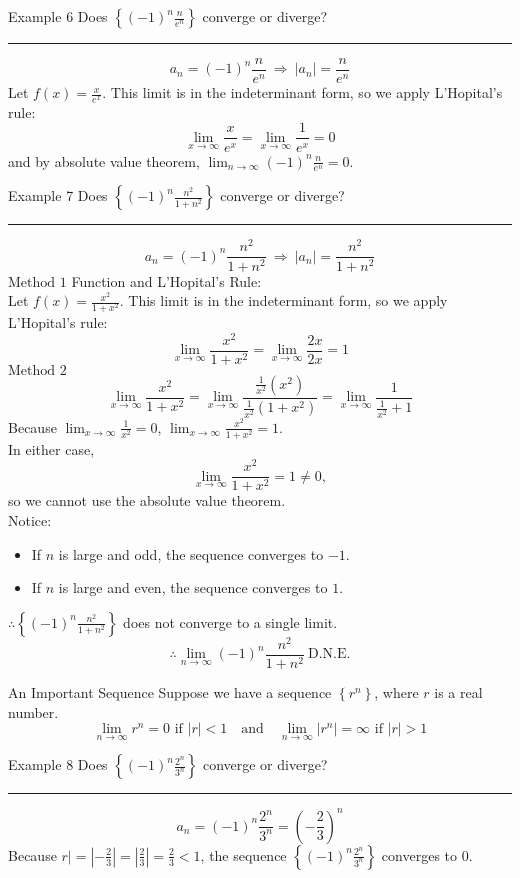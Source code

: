 \documentclass[12pt,a4paper]{article}
\def\DNE{\mathrm{D.N.E.}}
\begin{document}
\begin{eg}{Example 6}
	Does $\displaystyle\left\{(-1)^n\frac{n}{e^{n}}\right\}$ converge or diverge? \\
	\noindent\rule[0.25\baselineskip]{\textwidth}{1pt}
	$$a_n=(-1)^n\frac{n}{e^{n}}\ \Rightarrow\ \left|a_n\right|=\frac{n}{e^{n}}$$
	Let $f(x)=\displaystyle\frac{x}{e^x}$. This limit is in the indeterminant form, so we apply L'Hopital's rule: 
	$$\lim_{x\to\infty}\frac{x}{e^x}=\lim_{x\to\infty}\frac{1}{e^x}=0$$
	and by absolute value theorem, $\displaystyle\lim_{n\to\infty}(-1)^n\frac{n}{e^n}=0.$
\end{eg}
\begin{eg}{Example 7}
	Does $\displaystyle\left\{(-1)^n\frac{n^2}{1+n^2}\right\}$ converge or diverge? \\
	\noindent\rule[0.25\baselineskip]{\textwidth}{1pt}
	$$a_n=(-1)^n\frac{n^2}{1+n^2}\ \Rightarrow\ \left|a_n\right|=\frac{n^2}{1+n^2}$$
	$\boxed{\text{Method }1}$ Function and L'Hopital's Rule: \\
	Let $f(x)=\displaystyle\frac{x^2}{1+x^2}$. This limit is in the indeterminant form, so we apply L'Hopital's rule: 
	$$\lim_{x\to\infty}\frac{x^2}{1+x^2}=\lim_{x\to\infty}\frac{2x}{2x}=1$$
	$\boxed{\text{Method }2}$
	$$\lim_{x\to\infty}\frac{x^2}{1+x^2}=\lim_{x\to\infty}\frac{\frac{1}{x^2}(x^2)}{\frac{1}{x^2}(1+x^2)}=\lim_{x\to\infty}\frac{1}{\frac{1}{x^2}+1}$$
	Because $\displaystyle\lim_{x\to\infty}\frac{1}{x^2}=0$, $\displaystyle\lim_{x\to\infty}\frac{x^2}{1+x^2}=1$.\\
	In either case, 
	$$\displaystyle\lim_{x\to\infty}\frac{x^2}{1+x^2}=1\neq0, $$
	so we cannot use the absolute value theorem. \\
	Notice: 
	\begin{itemize}
		\item If $n$ is large and odd, the sequence converges to $-1$.
		\item If $n$ is large and even, the sequence converges to $1$.
	\end{itemize}
	$\therefore\displaystyle\left\{(-1)^n\frac{n^2}{1+n^2}\right\}$ does not converge to a single limit. 
	$$\therefore\lim_{n\to\infty}(-1)^n\frac{n^2}{1+n^2}\ \DNE$$
\end{eg}
\begin{rmk}{An Important Sequence}
	Suppose we have a sequence $\left\{r^n\right\}$, where $r$ is a real number. 
	$$\lim_{n\to\infty}r^n=0\text{ if }|r|<1\quad\text{and}\quad\lim_{n\to\infty}|r^n|=\infty\text{ if }|r|>1$$	
\end{rmk}
\begin{eg}{Example 8}
	Does $\displaystyle\left\{(-1)^n\frac{2^n}{3^n}\right\}$ converge or diverge? \\
	\noindent\rule[0.25\baselineskip]{\textwidth}{1pt}
	$$a_n=(-1)^n\frac{2^n}{3^n}=\left(-\frac{2}{3}\right)^n$$
	Because $\displaystyle r|=\left|-\frac{2}{3}\right|=\left|\frac{2}{3}\right|=\frac{2}{3}<1$, the sequence $\displaystyle\left\{(-1)^n\frac{2^n}{3^n}\right\}$ converges to $0$.
\end{eg}
\end{document}
